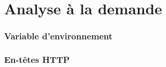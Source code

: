 \section{Analyse à la demande}
  \subsubsection{Variable d'environnement}
  \subsubsection{En-têtes HTTP}